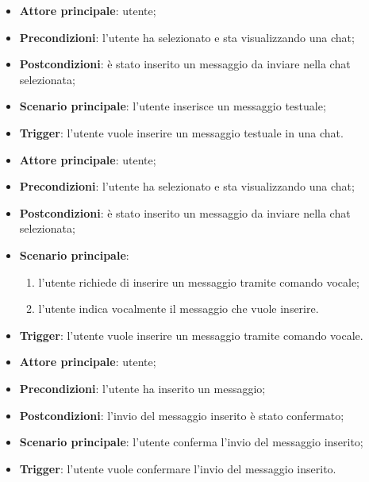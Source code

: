 \documentclass[10pt, a4paper]{article}
\begin{document}
    \begin{itemize}
        \item \textbf{Attore principale}: utente;
        \item \textbf{Precondizioni}: l’utente ha selezionato e sta visualizzando una chat;
        \item \textbf{Postcondizioni}: è stato inserito un messaggio da inviare nella chat selezionata;
        \item \textbf{Scenario principale}: l’utente inserisce un messaggio testuale;
        \item \textbf{Trigger}: l’utente vuole inserire un messaggio testuale in una chat.
    \end{itemize}
    
    \begin{itemize}
        \item \textbf{Attore principale}: utente;
        \item \textbf{Precondizioni}: l’utente ha selezionato e sta visualizzando una chat;
        \item \textbf{Postcondizioni}: è stato inserito un messaggio da inviare nella chat selezionata;
        \item \textbf{Scenario principale}:
            \begin{enumerate}
                \item l’utente richiede di inserire un messaggio tramite comando vocale;
                \item l’utente indica vocalmente il messaggio che vuole inserire.
            \end{enumerate}
        \item \textbf{Trigger}: l’utente vuole inserire un messaggio tramite comando vocale.
    \end{itemize}

    \begin{itemize}
        \item \textbf{Attore principale}: utente;
        \item \textbf{Precondizioni}: l'utente ha inserito un messaggio;
        \item \textbf{Postcondizioni}: l'invio del messaggio inserito è stato confermato;
        \item \textbf{Scenario principale}: l’utente conferma l'invio del messaggio inserito;
        \item \textbf{Trigger}: l’utente vuole confermare l'invio del messaggio inserito.
    \end{itemize}
\end{document}
